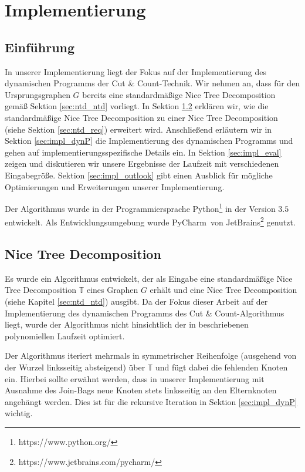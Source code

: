 \chapter{Implementierung}
\label{c:impl}

\section{Einführung}
\label{sec:impl_intro}
In unserer Implementierung liegt der Fokus auf der Implementierung des dynamischen Programms der Cut \& Count-Technik. 
Wir nehmen an, dass für den Ursprungsgraphen $G$ bereits eine standardmäßige Nice Tree Decomposition gemäß Sektion \ref{sec:ntd_ntd} vorliegt. 
In Sektion \ref{sec:impl_ntd} erklären wir, wie die standardmäßige Nice Tree Decomposition zu einer Nice Tree Decomposition (siehe Sektion \ref{sec:ntd_req}) erweitert wird. 
Anschließend erläutern wir in Sektion \ref{sec:impl_dynP} die Implementierung des dynamischen Programms und gehen auf implementierungsspezifische Details ein. 
In Sektion \ref{sec:impl_eval} zeigen und diskutieren wir unsere Ergebnisse der Laufzeit mit verschiedenen Eingabegröße.
Sektion \ref{sec:impl_outlook} gibt einen Ausblick für mögliche Optimierungen und Erweiterungen unserer Implementierung.

Der Algorithmus wurde in der Programmiersprache Python\footnote{https://www.python.org/} in der Version $3.5$ entwickelt. Als Entwicklungsumgebung wurde PyCharm\SymbReg ~von JetBrains\footnote{https://www.jetbrains.com/pycharm/} genutzt.
\section{Nice Tree Decomposition}
\label{sec:impl_ntd}
Es wurde ein Algorithmus entwickelt, der als Eingabe eine standardmäßige Nice Tree Decomposition $\mathbb{T}$ eines Graphen $G$ erhält und eine Nice Tree Decomposition (siehe Kapitel \ref{sec:ntd_ntd}) ausgibt. 
Da der Fokus dieser Arbeit auf der Implementierung des dynamischen Programms des Cut \& Count-Algorithmus liegt, wurde der Algorithmus nicht hinsichtlich der in \cite{kloks1994} beschriebenen polynomiellen Laufzeit optimiert. 

Der Algorithmus iteriert mehrmals in symmetrischer Reihenfolge (ausgehend von der Wurzel linksseitig absteigend) über $\mathbb{T}$ und fügt dabei die fehlenden Knoten ein. 
Hierbei sollte erwähnt werden, dass in unserer Implementierung mit Ausnahme des \glqq Join\grqq -Bags neue Knoten stets linksseitig an den Elternknoten angehängt werden. 
Dies ist für die rekursive Iteration in Sektion \ref{sec:impl_dynP} wichtig.

